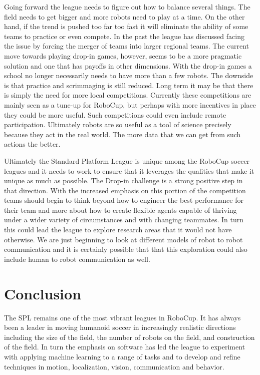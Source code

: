 \documentclass{llncs}
\begin{document}
Going forward the league needs to figure out how to balance several things. The field
needs to get bigger and more robots need to play at a time. On the other hand, if the
trend is pushed too far too fast it will eliminate the ability of some teams to practice or
even compete. In the past the league has discussed facing the issue by forcing the
merger of teams into larger regional teams. The current move towards playing drop-in
games, however, seems to be a more pragmatic solution and one that has payoffs
in other dimensions. With the drop-in games a school no longer necessarily needs to have more
than a few robots. The downside is that practice and scrimmaging is still reduced. Long term it may be
that there is simply the need for more local competitions. Currently these competitions
are mainly seen as a tune-up for RoboCup, but perhaps with more incentives in place
they could be more useful. Such competitions could even include remote participation. Ultimately
robots are so useful as a tool of science precisely because they act in the real world. The
more data that we can get from such actions the better.

Ultimately the Standard Platform League is unique among the RoboCup soccer leagues
and it needs to work to ensure that it leverages the qualities that make it unique as much
as possible. The Drop-in challenge is a strong positive step in that direction. With the
increased emphasis on this portion of the competition teams should begin to think beyond
how to engineer the best performance for their team and more about how to create flexible
agents capable of thriving under a wider variety of circumstances and with changing
teammates. In turn this could lead the league to explore research areas that it would not have
otherwise. We are just beginning to look at different models of robot to robot communication and
it is certainly possible that that this exploration could also include human to robot communication
as well.

\section{Conclusion}

The SPL remains one of the most vibrant leagues in RoboCup. It has always been a leader in
moving humanoid soccer in increasingly realistic directions including the size of the field, the
number of robots on the field, and construction of the field. In turn the emphasis on software has
led the league to experiment with applying machine learning to a range of tasks and to develop
and refine techniques in motion, localization, vision, communication and behavior.


 
\end{document}

